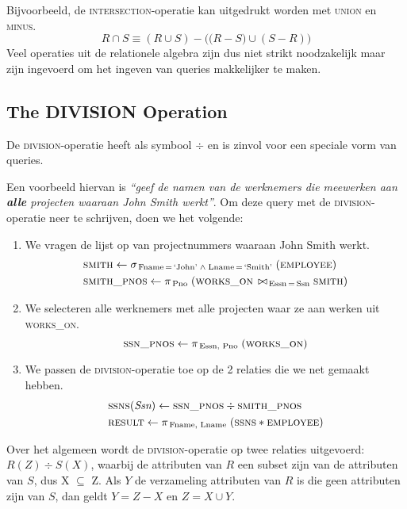 Bijvoorbeeld, de \textsc{intersection}-operatie kan uitgedrukt worden met \textsc{union} en \textsc{minus}.
\vspace{-2mm}
\[ R \cap S \equiv (R \cup S) - \big( \big(R-S) \cup (S-R) \big) \]
Veel operaties uit de relationele algebra zijn dus niet strikt noodzakelijk maar zijn ingevoerd om het ingeven van queries makkelijker te maken.


\subsection{The DIVISION Operation}
De \textsc{division}-operatie heeft als symbool $\div$ en is zinvol voor een speciale vorm van queries.

Een voorbeeld hiervan is \textit{``geef de namen van de werknemers die meewerken aan \textbf{alle} projecten waaraan John Smith werkt''}. Om deze query met de \textsc{division}-operatie neer te schrijven, doen we het volgende:
\begin{enumerate}
	\item We vragen de lijst op van projectnummers waaraan John Smith werkt.
	\vspace{-2mm}
	\begin{align*}
	& \textsc{smith} \leftarrow \sigma_{\,\text{Fname} \,=\, \text{`John'} \; \wedge \; \text{Lname} \,=\, \text{`Smith'}} \;(\textsc{employee}) \\
	& \textsc{smith\_pnos} \leftarrow \pi_{\,\text{Pno}} \;(\textsc{works\_on} \,\bowtie_{\,\text{Essn} \,=\, \text{Ssn}} \textsc{smith})
	\end{align*}
	
	\item We selecteren alle werknemers met alle projecten waar ze aan werken uit \textsc{works\_on}.
	\vspace{-2mm}
	\[ \textsc{ssn\_pnos} \leftarrow \pi_{\,\text{Essn, Pno}} \;(\textsc{works\_on}) \]
	
	\item We passen de \textsc{division}-operatie toe op de 2 relaties die we net gemaakt hebben.
	\vspace{-2mm}
	\begin{align*}
	& \textsc{ssns}(\textit{Ssn}) \leftarrow \textsc{ssn\_pnos} \div \textsc{smith\_pnos}\\
	& \textsc{result} \leftarrow \pi_{\,\text{Fname, Lname}} \;(\textsc{ssns} * \textsc{employee})
	\end{align*}
\end{enumerate}
Over het algemeen wordt de \textsc{division}-operatie op twee relaties uitgevoerd: $R(Z) \div S(X)$, waarbij de attributen van $R$ een subset zijn van de attributen van $S$, dus X $\subseteq$ Z. Als $Y$ de verzameling attributen van $R$ is die geen attributen zijn van $S$, dan geldt $Y = Z-X$ en $Z = X \cup Y$.

